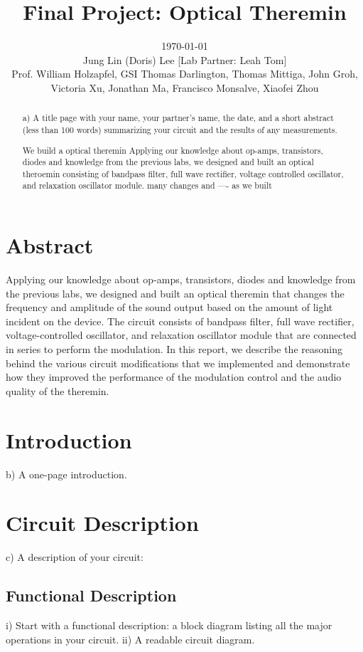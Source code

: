\documentclass[authoryear, 12pt,5p, times]{elsarticle}
\begin{document}
\begin{frontmatter}
\title{Final Project: Optical Theremin}
\author{\today \quad \\Jung Lin (Doris) Lee [Lab Partner: Leah Tom]\\Prof. William Holzapfel, GSI Thomas Darlington, Thomas Mittiga, John Groh,  \\Victoria Xu, Jonathan Ma, Francisco Monsalve, Xiaofei Zhou\vspace{-30pt}}	 
\begin{abstract}
a)              A title page with your name, your partner’s name, the date, and a short abstract (less than 100 words) summarizing your circuit and the results of any measurements.

We build a optical theremin 
Applying our knowledge about op-amps, transistors, diodes and knowledge from the previous labs, we designed and built an optical theroemin consisting of bandpass filter, full wave rectifier, voltage controlled oscillator, and relaxation oscillator module. 
many changes and ---- as we built
 \end{abstract}
\end{frontmatter}
\section{Abstract}
Applying our knowledge about op-amps, transistors, diodes and knowledge from the previous labs, we designed and built an optical theremin that changes the frequency and amplitude of the sound output based on the amount of light incident on the device. The circuit consists of bandpass filter, full wave rectifier, voltage-controlled oscillator, and relaxation oscillator module that are connected in series to perform the modulation. In this report, we describe the reasoning behind the various circuit modifications that we implemented and demonstrate how they improved the performance of the modulation control and the audio quality of the theremin. 
\section{Introduction}

b)              A one-page introduction.
\section{Circuit Description}
c)               A description of your circuit:
\subsection{Functional Description}
i)                Start with a functional description: a block diagram listing all the major operations in your circuit.
ii)              A readable circuit diagram.
\end{document}
